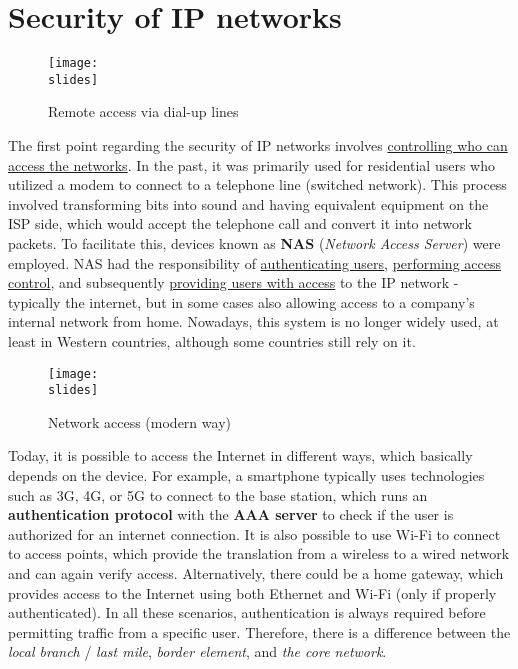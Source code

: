 \chapter{Security of IP networks}

\begin{figure}[h]
    \centering
    \texttt{[image: \\slides]}
    \caption{Remote access via dial-up lines}
\end{figure}

The first point regarding the security of IP networks involves \ul{controlling who can access the networks}.
In the past, it was primarily used for residential users who utilized a modem to connect to a telephone line (switched network).
This process involved transforming bits into sound and having equivalent equipment on the ISP side, which would accept the telephone call and convert it into network packets.
To facilitate this, devices known as \textbf{NAS} (\textit{Network Access Server}) were employed.
NAS had the responsibility of \underline{authenticating users}, \underline{performing access control}, and subsequently \underline{providing users with access} to the IP network - typically the internet, but in some cases also allowing access to a company's internal network from home.
Nowadays, this system is no longer widely used, at least in Western countries, although some countries still rely on it.


\begin{figure}[h]
    \centering
    \texttt{[image: \\slides]}
    \caption{Network access (modern way)}
\end{figure}

Today, it is possible to access the Internet in different ways, which basically depends on the device.
For example, a smartphone typically uses technologies such as 3G, 4G, or 5G to connect to the base station, which runs an \textbf{authentication protocol} with the \textbf{AAA server} to check if the user is authorized for an internet connection.
It is also possible to use Wi-Fi to connect to access points, which provide the translation from a wireless to a wired network and can again verify access.
Alternatively, there could be a home gateway, which provides access to the Internet using both Ethernet and Wi-Fi (only if properly authenticated).
In all these scenarios, authentication is always required before permitting traffic from a specific user.
Therefore, there is a difference between the \textit{local branch} / \textit{last mile}, \textit{border element}, and \textit{the core network}.



